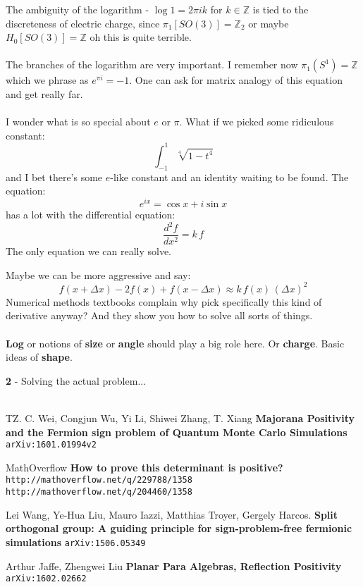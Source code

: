 \documentclass[12pt]{article}
\begin{document}
\noindent The ambiguity of the logarithm - $\log 1 = 2\pi i k$ for $k \in \mathbb{Z}$ is tied to the discreteness of electric charge, since $\pi_1[SO(3)] = \mathbb{Z}_2$ or maybe $ H_0[SO(3)] = \mathbb{Z} $ oh this is quite terrible. \\ \\
The branches of the logarithm are very important.  I remember now $\pi_1(S^1) = \mathbb{Z}$ which we phrase as $e^{\pi i } = -1 $.  One can ask for matrix analogy of this equation and get really far. \\ \\
I wonder what is so special about $e$ or $\pi$.  What if we picked some ridiculous constant:
$$ \int_{-1}^1 \sqrt[4]{1 - t^4} $$
and I bet there's some $e$-like constant and an identity waiting to be found.  The equation:
$$ e^{ix} = \cos x + i \sin x $$
has a lot with the differential equation:
$$ \frac{d^2 f}{dx^2} = k\, f$$
The only equation we can really solve.  \newpage 

\noindent Maybe we can be more aggressive and say:
$$ f(x + \Delta x) - 2 f(x) + f(x - \Delta x) \approx k \, f(x) \, (\Delta x)^2 $$
Numerical methods textbooks complain why pick specifically this kind of derivative anyway?  And they show you how to solve all sorts of things. \\ \\
\textbf{Log} or notions of \textbf{size} or \textbf{angle} should play a big role here.  Or \textbf{charge}.  Basic ideas of \textbf{shape}. \newpage

\noindent \textbf{2} - Solving the actual problem... \\ \\
\newpage

\selectfont \fontsize{12}{10}\selectfont

\begin{thebibliography}{}

\item TZ. C. Wei, Congjun Wu, Yi Li, Shiwei Zhang, T. Xiang \textbf{Majorana Positivity and the Fermion sign problem of Quantum Monte Carlo Simulations} \texttt{ arXiv:1601.01994v2}

\item MathOverflow \textbf{How to prove this determinant is positive?}  \\ \texttt{http://mathoverflow.net/q/229788/1358} \\ \texttt{http://mathoverflow.net/q/204460/1358}

\item Lei Wang, Ye-Hua Liu, Mauro Iazzi, Matthias Troyer, Gergely Harcos. \textbf{Split orthogonal group: A guiding principle for sign-problem-free fermionic simulations}
\texttt{arXiv:1506.05349}

\item Arthur Jaffe, Zhengwei Liu \textbf{Planar Para Algebras, Reflection Positivity} \texttt{arXiv:1602.02662} 

\end{thebibliography}
\end{document}
